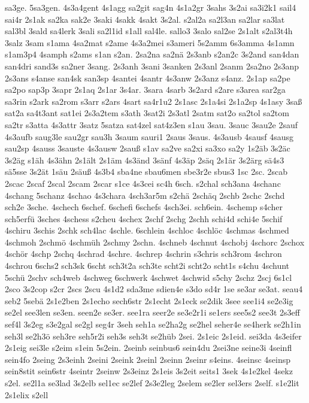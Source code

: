 {sa3ge.
5sa3gen.
4s3a4gent
4s1agg
sa2git
sag4n
4s1a2gr
3sahs
3s2ai
sa3i2k1
sail4
sai4r
2s1ak
sa2ka
sak2e
3saki
4sakk
4sakt
3s2al.
s2al2a
sa2l3an
sa2lar
sa3lat
sal3bl
3sald
sa4lerk
3sali
sa2l1id
s1all
sal4le.
sallo3
3salo
sal2se
2s1alt
s2al3t4h
3salz
3sam
s1ama
4sa2mat
s2ame
4s3a2mei
s3ameri
5s2amm
6s3amma
4s1amn
s1am3p4
4samph
s2ams
s1an
s2an.
2sa2na
sa2nä
2s3anb
s2an2c
3s2and
san4dan
san4dri
sand3s
sa2ner
3sang.
2s3anh
3sani
3sanken
2s3anl
2sanm
2sa2no
2s3anp
2s3ans
s4anse
san4sk
san3sp
4santei
4santr
4s3anw
2s3anz
s4anz.
2s1ap
sa2pe
sa2po
sap3p
3sapr
2s1aq
2s1ar
3s4ar.
3sara
4sarb
3s2ard
s2are
s3area
sar2ga
sa3rin
s2ark
sa2rom
s3arr
s2ars
4sart
sa4r1u2
2s1asc
2s1a4si
2s1a2sp
4s1asy
3saß
sat2a
sa4t3ant
sat1ei
2s3a2tem
s3ath
3sat2i
2s3atl
2satm
sat2o
sa2tol
sa2tom
sa2tr
s3atta
4s3attr
3satz
5satza
sat4zel
sat4z3en
s1au
3sau.
3sauc
3sau2e
2sauf
4s3aufb
saug3le
sau2gr
sau3h
3saum
sauri1
2saus
3saus.
4s3ausb
4sausf
4sausg
sau2sp
4sauss
3sauste
4s3ausw
2sauß
s1av
sa2ve
sa2xi
sa3xo
sa2y
1s2äb
3s2äc
3s2äg
s1äh
4s3ähn
2s1ält
2s1äm
4s3änd
3sänf
4s3äp
2säq
2s1är
3s2ärg
sä4s3
sä5sse
3s2ät
1säu
2säuß
4s3b4
sba4ne
sbau6men
sbe3r2e
sbus3
1sc
2sc.
2scab
2scac
2scaf
2scal
2scam
2scar
s1ce
4s3cei
sc4h
6sch.
s2chal
sch3ana
4schanc
4schang
5schanz
4schao
4s3chara
4sch3ar5m
s2chä
2schäq
2schb
2schc
2schd
sch2e
3sche.
4schech
6schef.
6schefi
6schefs
4sch3ei.
sch6ein.
4schemp
s4cher
sch5erfü
3sches
4schess
s2cheu
4schex
2schf
2schg
2schh
schi4d
schi4e
5schif
4schiru
3schis
2schk
sch4lac
4schle.
6schlein
4schloc
4schlöc
4schmas
4schmed
4schmoh
2schmö
4schmüh
2schmy
2schn.
4schneb
4schnut
4schobj
4schorc
2schox
4schör
4schp
2schq
4schrad
4schre.
4schrep
4schrin
s3chris
sch3rom
4schron
4schrou
6schs2
sch3sk
6scht
sch3t2a
sch3te
scht2i
scht2o
scht1s
s4chu
4schunt
5schü
2schv
sch4web
4schweg
6schwerk
4schwet
4schwid
s5chy
2schz
2scj
6s1cl
2sco
3s2cop
s2cr
2scs
2scu
4s1d2
sda3me
sdien4e
s3do
sd4r
1se
se3ar
se3at.
seau4
seb2
5sebä
2s1e2ben
2s1echo
sech6str
2s1echt
2s1eck
se2dik
3see
see1i4
se2e3ig
se2el
see3len
se3en.
seen2e
se3er.
see1ra
seer2e
se3e2r1i
se1ers
see5s2
see3t
2s3eff
sef4l
3s2eg
s3e2gal
se2gl
seg4r
3seh
seh1a
se2ha2g
se2hel
seher4e
se4herk
se2h1in
seh3l
se2h3ö
seh3re
seh5r2i
seh3s
seh3t
se2hüb
2sei.
2s1eic
2s1eid.
sei3da
4s3eifer
2s1eig
sei3le
s2eim
s1ein
5s2ein.
2seinb
seinbus6
sein4du
2sei3ne
seine3i
4seinfl
sein4fo
2seing
2s3einh
2seini
2seink
2seinl
2seinn
2seinr
s4eins.
4seinsc
4seinsp
sein8stit
sein6str
4seintr
2seinw
2s3einz
2s1eis
3s2eit
seits1
3sek
4s1e2kel
4sekz
s2el.
se2l1a
se3lad
3s2elb
sel1ec
se2lef
2s3e2leg
2selem
se2ler
sel3ers
2self.
s1e2lit
2s1elix
s2ell
}
